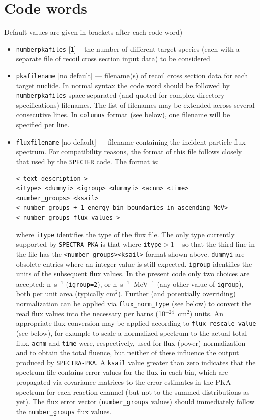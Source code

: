 \documentclass[a4paper]{article}
\begin{document}
\section{Code words}
Default values are given in brackets after each code word)
\begin{itemize}


\item \texttt{number{\textunderscore}pka{\textunderscore}files} [\texttt{1}] -- the number of different target species (each with a separate file of recoil cross section input data) to be considered
\item \texttt{pka{\textunderscore}filename} [no default] --- filename(s) of recoil cross section data for each target nuclide. In normal syntax the code word should be followed by \texttt{number{\textunderscore}pka{\textunderscore}files} space-separated (and quoted for complex directory specifications) filenames. The list of filenames may be extended across several consecutive lines. In \texttt{columns} format (see below), one filename will be specified per line.
\item \texttt{flux{\textunderscore}filename} [no default] --- filename containing the incident particle flux spectrum. For compatibility reasons, the format of this file follows closely that used by the \texttt{SPECTER} code. The format is:\\
    \begin{verbatim}
< text description >
<itype> <dummyi> <igroup> <dummyi> <acnm> <time>
<number_groups> <ksail>
< number_groups + 1 energy bin boundaries in ascending MeV>
< number_groups flux values >
    \end{verbatim}
    where \texttt{itype} identifies the type of the flux file. The only type currently supported by \texttt{SPECTRA-PKA} is that where \texttt{itype}\(>1\) -- so that the third line in the file has the \verb|<number_groups><ksail>| format shown above. \texttt{dummyi} are obsolete entries where an integer value is still expected. \texttt{igroup} identifies the units of the subsequent flux values. In the present code only two choices are accepted: n~s\(^{-1}\) (\texttt{igroup=2}), or n~s\(^{-1}\)~MeV\(^{-1}\) (any other value of \texttt{igroup}), both per unit area (typically cm\(^2\)). Further (and potentially overriding) normalization can be applied via  \verb|flux_norm_type| (see below) to convert the read flux values into the necessary per barns (10\(^{-24}\)~cm\(^2\)) units. An appropriate flux conversion may be applied according to \verb|flux_rescale_value| (see below), for example to scale a normalized spectrum to the actual total flux.  \texttt{acnm} and \texttt{time} were, respectively, used for flux (power) normalization and to obtain the total fluence, but neither of these influence the output produced by \texttt{SPECTRA-PKA}. A \texttt{ksail} value greater than zero indicates that the spectrum file contains error values for the flux in each bin, which are propagated via covariance matrices to the error estimates in the PKA spectrum for each reaction channel (but not to the summed distributions as yet). The flux error vector (\verb|number_groups| values) should immediately follow the \verb|number_groups| flux values.
    

\end{itemize}
\end{document}
